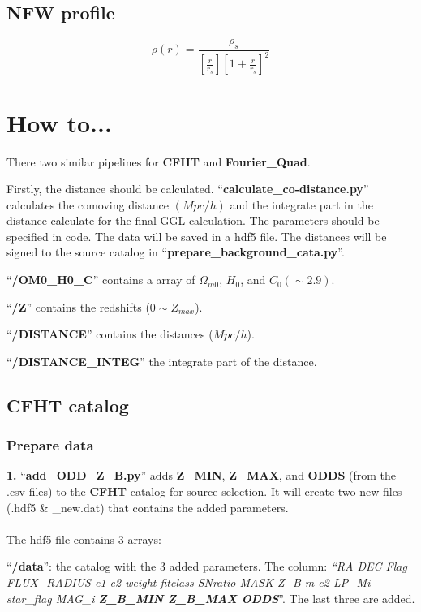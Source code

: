 \documentclass[12pt, a4paper]{article}
\begin{document}
\subsection{NFW profile}
\begin{equation}
\rho(r)= \frac{\rho_s}{[\frac{r}{r_s}][1+\frac{r}{r_s}]^2}
\end{equation}
\section{How to...}
There two similar pipelines for \textbf{CFHT} and \textbf{Fourier\_Quad}.

Firstly, the distance should be calculated. ``\textbf{calculate\_co-distance.py}'' calculates the comoving distance $(Mpc/h)$ and the integrate part in the distance calculate for the final GGL calculation. 
The parameters should be specified in code. The data will be saved in a hdf5 file. The distances will be signed to the source catalog in ``\textbf{prepare\_background\_cata.py}''.

\noindent``\textbf{/OM0\_H0\_C}'' contains a array of $\Omega_{m0}$, $H_0$, and $C_0(\sim 2.9)$.

\noindent``\textbf{/Z}'' contains the redshifts ($0 \sim Z_{max}$).

\noindent``\textbf{/DISTANCE}'' contains the distances ($Mpc/h$).

\noindent``\textbf{/DISTANCE\_INTEG}'' the integrate part of the distance.

\subsection{CFHT catalog}

\subsubsection{Prepare data}
\textbf{1.} ``\textbf{add\_ODD\_Z\_B.py}'' adds \textbf{Z\_MIN}, \textbf{Z\_MAX}, and \textbf{ODDS} (from the .csv files) to the \textbf{CFHT} catalog for source selection.
It will create two new files (.hdf5 \& \_new.dat) that contains the added parameters.
\\ \hspace*{\fill} \\
\noindent The hdf5 file contains 3 arrays:

\noindent``\textbf{/data}'': the catalog with the 3 added parameters. The column: \emph{``RA  DEC  Flag  FLUX\_RADIUS  e1  e2  weight  fitclass   SNratio  MASK  Z\_B  m  c2  LP\_Mi  star\_flag  MAG\_i  \textbf{Z\_B\_MIN  Z\_B\_MAX  ODDS}}''. The last three are added.
\end{document}

